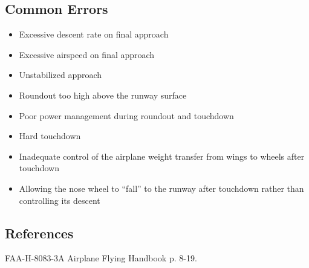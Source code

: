 \subsection{Common Errors}

\begin{itemize}
  \item Excessive descent rate on final approach
  \item Excessive airspeed on final approach
  \item Unstabilized approach
  \item Roundout too high above the runway surface
  \item Poor power management during roundout and touchdown
  \item Hard touchdown
  \item Inadequate control of the airplane weight transfer from wings to wheels
    after touchdown
  \item Allowing the nose wheel to ``fall'' to the runway after touchdown
    rather than controlling its descent
\end{itemize}

\subsection{References}

FAA-H-8083-3A Airplane Flying Handbook p. 8-19.

